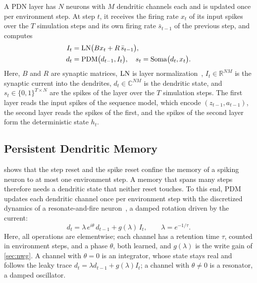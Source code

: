 A PDN layer has $N$ neurons with $M$ dendritic channels each and is updated once per environment step.
At step $t$, it receives the firing rate $x_t$ of its input spikes over the $T$ simulation steps and its own firing rate $\bar s_{t-1}$ of the previous step, and computes
\begin{equation}
\begin{aligned}
I_t &= \mathrm{LN}\big(B x_t + R\,\bar s_{t-1}\big),\\
d_t &= \mathrm{PDM}\big(d_{t-1}, I_t\big), \quad s_t = \mathrm{Soma}\big(d_t, x_t\big).
\end{aligned}
\label{eq:input}
\end{equation}
Here, $B$ and $R$ are synaptic matrices, $\mathrm{LN}$ is layer normalization~\cite{ba2016layernorm}, $I_t\in\mathbb{R}^{NM}$ is the synaptic current into the dendrites, $d_t\in\mathbb{C}^{NM}$ is the dendritic state, and $s_t\in\{0,1\}^{T\times N}$ are the spikes of the layer over the $T$ simulation steps.
The first layer reads the input spikes of the sequence model, which encode $(z_{t-1},a_{t-1})$, the second layer reads the spikes of the first, and the spikes of the second layer form the deterministic state $h_t$.

\subsection{Persistent Dendritic Memory}
\label{sec:pdm}

 shows that the step reset and the spike reset confine the memory of a spiking neuron to at most one environment step.
A memory that spans many steps therefore needs a dendritic state that neither reset touches.
To this end, PDM updates each dendritic channel once per environment step with the discretized dynamics of a resonate-and-fire neuron~\cite{izhikevich2001resonate}, a damped rotation driven by the current:
\begin{equation}
d_t = \lambda\, e^{i\theta}\, d_{t-1} + g(\lambda)\, I_t, \qquad \lambda = e^{-1/\tau}.
\label{eq:pdm}
\end{equation}
Here, all operations are elementwise; each channel has a retention time $\tau$, counted in environment steps, and a phase $\theta$, both learned, and $g(\lambda)$ is the write gain of \cref{sec:nwg}.
A channel with $\theta=0$ is an integrator, whose state stays real and follows the leaky trace $d_t=\lambda d_{t-1}+g(\lambda)I_t$; a channel with $\theta\neq0$ is a resonator, a damped oscillator.

